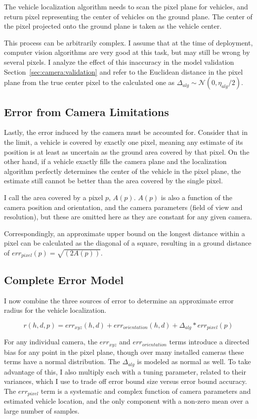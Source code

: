 \documentclass[a4paper,12pt,twoside,openright]{report}
\begin{document}
The vehicle localization algorithm needs to scan the pixel plane for vehicles,
and return pixel representing the center of vehicles on the ground plane.
The center of the pixel projected onto the ground plane is taken as the vehicle center.

This process can be arbitrarily complex. I assume that at the time of deployment, 
computer vision algorithms are very good at this task, but may still
be wrong by several pixels. I analyze the effect of this inaccuracy
in the model validation Section~\ref{sec:camera:validation} and refer to the Euclidean distance
in the pixel plane from the true center pixel to the calculated one
as $\Delta_{alg} \sim \mathcal{N}(0, \eta_{alg}/2)$.

\subsection{Error from Camera Limitations}

Lastly, the error induced by the camera must be accounted for. Consider that 
in the limit, a vehicle is covered by exactly one pixel, meaning any estimate
of its position is at least as uncertain as the ground area 
covered by that pixel. On the other hand, if a vehicle
exactly fills the camera plane and the localization algorithm perfectly determines
the center of the vehicle in the pixel plane, the estimate still cannot
be better than the area covered by the single pixel.

I call the area covered by a pixel $p$, $A(p)$. $A(p)$ is also a function of the camera
position and orientation, and the camera parameters (field of view and resolution),
but these are omitted here as they are constant for any given camera.

Correspondingly, an approximate upper bound on the longest distance
within a pixel can be calculated as the diagonal of a square,
resulting in a ground distance of $err_{pixel}(p) = \sqrt{(2A(p))}$. 


\subsection{Complete Error Model}

I now combine the three sources of error to determine an approximate
error radius for the vehicle localization.

\[
    r(h,d,p) = err_{xyz}(h,d) + err_{orientation}(h,d) + \Delta_{alg}*err_{pixel}(p)
\]

For any individual camera, the $err_{xyz}$ and $err_{orientation}$ terms introduce
a directed bias for any point in the pixel plane, though over many installed cameras
these terms have a normal distribution. The $\Delta_{alg}$ is 
modeled as normal as well. To take advantage of this, I also multiply each with a tuning
parameter, related to their variances, which I use to trade off error bound size versus
error bound accuracy. The $err_{pixel}$ term is a systematic 
and complex function of camera parameters and estimated vehicle location, and
the only component with a non-zero mean over a large number of samples.
\end{document}
